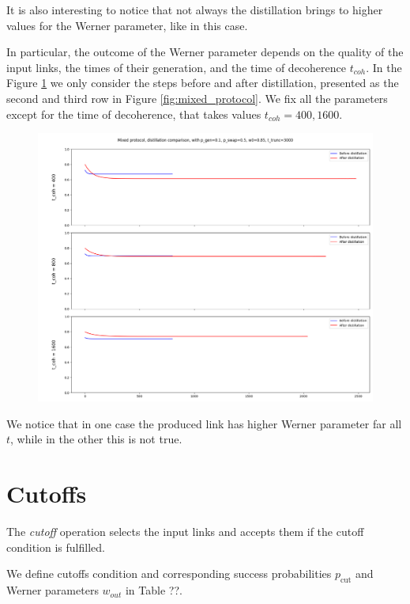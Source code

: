 \documentclass{masterthesis}
\begin{document}
It is also interesting to notice that not always the distillation brings to higher values for the Werner parameter, like in this case.

In particular, the outcome of the Werner parameter depends on the quality of the input links, the times of their generation, and the time of decoherence $t_{coh}$. 
In the Figure \ref{fig:mixed_protocol_dist_comparison} we only consider the steps before and after distillation, presented as the second and third row in Figure \ref{fig:mixed_protocol}. We fix all the parameters except for the time of decoherence, that takes values $t_{coh} = {400, 1600}$.

\begin{figure}[ht]
    \centering
    \includegraphics[width=1\linewidth]{images/mixed_protocol_dist_comp.png}
    \caption{}
    \label{fig:mixed_protocol_dist_comparison} 
\end{figure}

We notice that in one case the produced link has higher Werner parameter far all $t$, while in the other this is not true.

\newpage
\section*{Cutoffs}

The \textit{cutoff} operation selects the input links and accepts them if the cutoff condition is fulfilled. 

We define cutoffs condition and corresponding success probabilities $p_{\text{cut}}$ and Werner parameters $w_{out}$ in Table ??.
\end{document}
